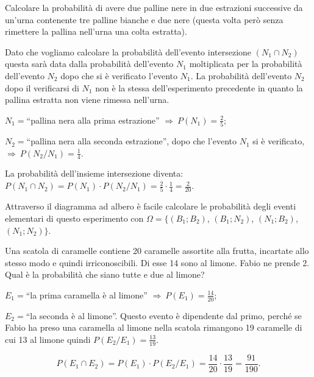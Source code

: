 \begin{exrig}
\begin{esempio}
Calcolare la probabilità di avere due palline nere in due estrazioni successive da un'urna contenente tre palline bianche e due nere (questa volta però senza rimettere la pallina nell'urna una colta estratta).

Dato che vogliamo calcolare la probabilità dell'evento intersezione $(N_1\cap N_2)$ questa sarà data dalla probabilità dell'evento $N_1$ moltiplicata per la probabilità dell'evento $N_2$ dopo che si è verificato l'evento $N_1$. La probabilità dell'evento $N_2$ dopo il verificarsi di $N_1$ non è la stessa dell'esperimento precedente in quanto la pallina estratta non viene rimessa nell'urna.
\begin{itemize*}
\item $N_{1}=$``pallina nera alla prima estrazione'' $\Rightarrow\: P(N_1)=\frac 2 5$;
\item $N_{2}=$``pallina nera alla seconda estrazione'', dopo che l'evento $N_1$ si è verificato, $\Rightarrow\: P(N_2/N_1)=\frac 1 4$.
\end{itemize*}
\begin{center}
 
\end{center}
La probabilità dell'insieme intersezione diventa: $P(N_1\cap N_2)=P(N_1)\cdot P(N_2/N_1)=\frac 2 5\cdot \frac 1 4=\frac 2{20}$.

Attraverso il diagramma ad albero è facile calcolare le probabilità degli eventi elementari di questo esperimento con $\Omega =\{(B_1;B_2)$, $(B_1;N_2)$, $(N_1;B_2)$, $(N_1;N_2)\}$.
\end{esempio}

\begin{esempio}
Una scatola di caramelle contiene 20 caramelle assortite alla frutta, incartate allo stesso modo e quindi irriconoscibili. Di esse 14 sono al limone. Fabio ne prende 2. Qual è la probabilità che siano tutte e due al limone?
\begin{itemize*}
\item $E_1=$``la prima caramella è al limone'' $\Rightarrow\: P(E_1)=\frac{14}{20}$;
\item $E_2=$``la seconda è al limone''. Questo evento è dipendente dal primo, perché se Fabio ha preso una caramella al limone nella scatola rimangono 19 caramelle di cui 13 al limone quindi $P(E_2/E_1)=\frac{13}{19}$.
\end{itemize*}
\[P(E_1\cap E_2)=P(E_1)\cdot P(E_2/E_1)=\frac{14}{20}\cdot \frac{13}{19}=\frac{91}{190}.\]
\end{esempio}
\end{exrig}

